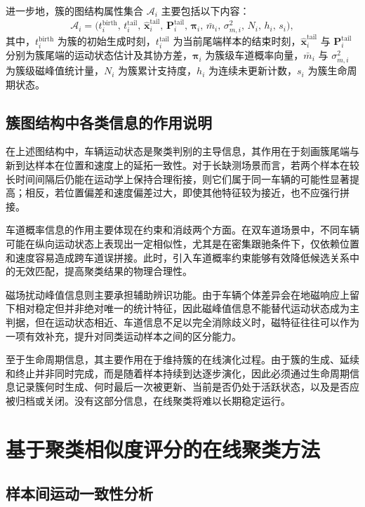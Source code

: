 \documentclass{xdupgthesis}
\begin{document}
进一步地，簇的图结构属性集合 $\mathcal{A}_i$ 主要包括以下内容：
\begin{equation}
	\mathcal{A}_i=
	\Big(
	t_i^{\mathrm{birth}},\,
	t_i^{\mathrm{tail}},\,
	\hat{\mathbf{x}}_i^{\mathrm{tail}},\,
	\mathbf{P}_i^{\mathrm{tail}},\,
	\boldsymbol{\pi}_i,\,
	\bar m_i,\,
	\sigma_{m,i}^{2},\,
	N_i,\,
	h_i,\,
	s_i
	\Big),
\end{equation}
其中，$t_i^{\mathrm{birth}}$ 为簇的初始生成时刻，$t_i^{\mathrm{tail}}$ 为当前尾端样本的结束时刻，$\hat{\mathbf{x}}_i^{\mathrm{tail}}$ 与 $\mathbf{P}_i^{\mathrm{tail}}$ 分别为簇尾端的运动状态估计及其协方差，$\boldsymbol{\pi}_i$ 为簇级车道概率向量，$\bar m_i$ 与 $\sigma_{m,i}^{2}$ 为簇级磁峰值统计量，$N_i$ 为簇累计支持度，$h_i$ 为连续未更新计数，$s_i$ 为簇生命周期状态。

\subsection{簇图结构中各类信息的作用说明}

在上述图结构中，车辆运动状态是聚类判别的主导信息，其作用在于刻画簇尾端与新到达样本在位置和速度上的延拓一致性。对于长缺测场景而言，若两个样本在较长时间间隔后仍能在运动学上保持合理衔接，则它们属于同一车辆的可能性显著提高；相反，若位置偏差和速度偏差过大，即使其他特征较为接近，也不应强行拼接。

车道概率信息的作用主要体现在约束和消歧两个方面。在双车道场景中，不同车辆可能在纵向运动状态上表现出一定相似性，尤其是在密集跟驰条件下，仅依赖位置和速度容易造成跨车道误拼接。此时，引入车道概率约束能够有效降低候选关系中的无效匹配，提高聚类结果的物理合理性。

磁场扰动峰值信息则主要承担辅助辨识功能。由于车辆个体差异会在地磁响应上留下相对稳定但并非绝对唯一的统计特征，因此磁峰值信息不能替代运动状态成为主判据，但在运动状态相近、车道信息不足以完全消除歧义时，磁特征往往可以作为一项有效补充，提升对同类运动样本之间的区分能力。

至于生命周期信息，其主要作用在于维持簇的在线演化过程。由于簇的生成、延续和终止并非同时完成，而是随着样本持续到达逐步演化，因此必须通过生命周期信息记录簇何时生成、何时最后一次被更新、当前是否仍处于活跃状态，以及是否应被归档或关闭。没有这部分信息，在线聚类将难以长期稳定运行。

\section{基于聚类相似度评分的在线聚类方法}

\subsection{样本间运动一致性分析}
\end{document}
